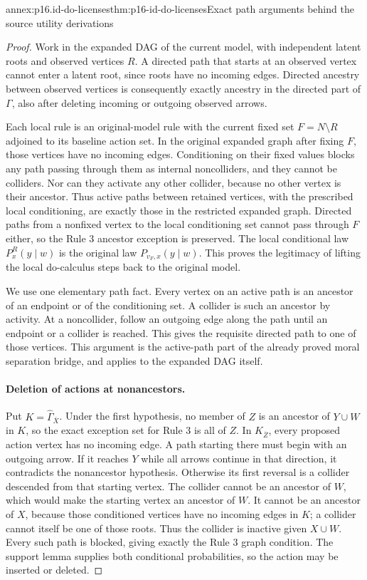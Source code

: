 \begin{annexitem}{annex:p16.id-do-licenses}{thm:p16-id-do-licenses}{Exact path arguments behind the source utility derivations}
\begin{proof}
Work in the expanded DAG of the current model, with independent
latent roots and observed vertices \(R\). A directed path that
starts at an observed vertex cannot enter a latent root, since roots
have no incoming edges. Directed ancestry between observed vertices
is consequently exactly ancestry in the directed part of \(\Gamma\),
also after deleting incoming or outgoing observed arrows.

Each local rule is an original-model rule with the current fixed set
\(F=N\setminus R\) adjoined to its baseline action set. In the
original expanded graph after fixing \(F\), those vertices have
no incoming edges. Conditioning on their fixed values blocks any
path passing through them as internal noncolliders, and they cannot
be colliders. Nor can they activate any other collider, because no
other vertex is their ancestor. Thus active paths between retained
vertices, with the prescribed local conditioning, are exactly those
in the restricted expanded graph. Directed paths from a nonfixed
vertex to the local conditioning set cannot pass through \(F\)
either, so the Rule 3 ancestor exception is preserved. The local
conditional law \(P^R_x(y\mid w)\) is the original law
\(P_{v_F,x}(y\mid w)\). This proves the legitimacy of lifting
the local do-calculus steps back to the original model.

We use one elementary path fact. Every vertex on an active path is
an ancestor of an endpoint or of the conditioning set. A collider
is such an ancestor by activity. At a noncollider, follow an outgoing
edge along the path until an endpoint or a collider is reached.
This gives the requisite directed path to one of those vertices.
This argument is the active-path part of the already proved moral
separation bridge, and applies to the expanded DAG itself.

\paragraph{Deletion of actions at nonancestors.}
Put \(K=\widehat\Gamma_{\overline X}\). Under the first
hypothesis, no member of \(Z\) is an ancestor of \(Y\cup W\)
in \(K\), so the exact exception set for Rule 3 is all of
\(Z\). In \(K_{\overline Z}\), every proposed action vertex
has no incoming edge. A path starting there must begin with an
outgoing arrow. If it reaches \(Y\) while all arrows continue
in that direction, it contradicts the nonancestor hypothesis.
Otherwise its first reversal is a collider descended from that
starting vertex. The collider cannot be an ancestor of \(W\),
which would make the starting vertex an ancestor of \(W\).
It cannot be an ancestor of \(X\), because those conditioned
vertices have no incoming edges in \(K\); a collider cannot
itself be one of those roots. Thus the collider is inactive given
\(X\cup W\). Every such path is blocked, giving exactly the
Rule 3 graph condition. The support lemma supplies both conditional
probabilities, so the action may be inserted or deleted.


\end{proof}
\end{annexitem}

